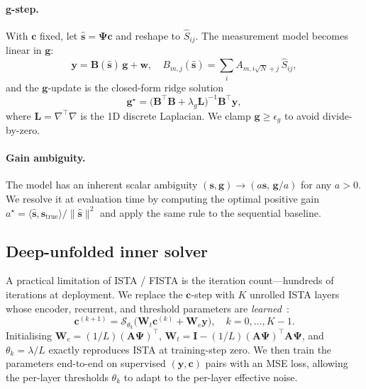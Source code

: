 \documentclass{article}
\begin{document}
\paragraph{g-step.} With $\boldsymbol{c}$ fixed, let $\hat{\boldsymbol{s}} = \boldsymbol{\Psi}\boldsymbol{c}$ and reshape to $\hat{S}_{ij}$. The measurement model becomes linear in $\boldsymbol{g}$:
\begin{equation}
  \boldsymbol{y} = \boldsymbol{B}(\hat{\boldsymbol{s}})\,\boldsymbol{g} + \boldsymbol{w},
  \quad
  B_{m,j}(\hat{\boldsymbol{s}}) = \sum_i A_{m, i \sqrt{N} + j}\, \hat{S}_{ij},
\end{equation}
and the $\boldsymbol{g}$-update is the closed-form ridge solution
\begin{equation}
  \boldsymbol{g}^\star =
    \big(\boldsymbol{B}^\top \boldsymbol{B} + \lambda_g \boldsymbol{L}\big)^{-1}
    \boldsymbol{B}^\top \boldsymbol{y},
\end{equation}
where $\boldsymbol{L} = \nabla^\top \nabla$ is the 1D discrete Laplacian. We clamp $\boldsymbol{g} \ge \epsilon_g$ to avoid divide-by-zero.

\paragraph{Gain ambiguity.} The model has an inherent scalar ambiguity $(\boldsymbol{s}, \boldsymbol{g}) \to (a\boldsymbol{s},\, \boldsymbol{g}/a)$ for any $a > 0$. We resolve it at evaluation time by computing the optimal positive gain $a^\star = \langle \hat{\boldsymbol{s}}, \boldsymbol{s}_\text{true} \rangle / \|\hat{\boldsymbol{s}}\|^2$ and apply the same rule to the sequential baseline.

\subsection{Deep-unfolded inner solver}

A practical limitation of ISTA / FISTA is the iteration count---hundreds of iterations at deployment. We replace the $\boldsymbol{c}$-step with $K$ unrolled ISTA layers whose encoder, recurrent, and threshold parameters are \emph{learned}~\citep{gregor2010lista}:
\begin{equation}
  \boldsymbol{c}^{(k+1)} =
  \mathcal{S}_{\theta_k}\!\big(
    \boldsymbol{W}_t \boldsymbol{c}^{(k)} + \boldsymbol{W}_e \boldsymbol{y}
  \big),\quad k=0,\dots,K-1.
  \label{eq:lista}
\end{equation}
Initialising $\boldsymbol{W}_e = (1/L)(\boldsymbol{A}\boldsymbol{\Psi})^\top$, $\boldsymbol{W}_t = \boldsymbol{I} - (1/L)(\boldsymbol{A}\boldsymbol{\Psi})^\top \boldsymbol{A}\boldsymbol{\Psi}$, and $\theta_k = \lambda/L$ exactly reproduces ISTA at training-step zero. We then train the parameters end-to-end on supervised $(\boldsymbol{y}, \boldsymbol{c})$ pairs with an MSE loss, allowing the per-layer thresholds $\theta_k$ to adapt to the per-layer effective noise.
\end{document}

